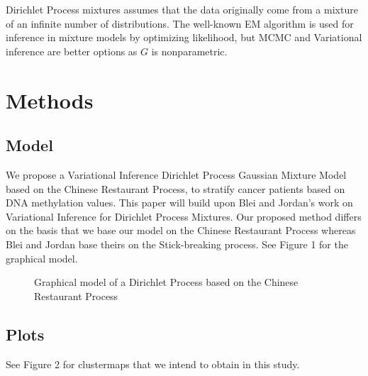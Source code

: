 \documentclass{article}
\begin{document}
Dirichlet Process mixtures assumes that the data originally come from a mixture of an infinite number of distributions.  The well-known EM algorithm is used for inference in mixture models by optimizing likelihood,  but MCMC and Variational inference are better options as $G$ is nonparametric.
\section{Methods}
\label{gen_inst}

\subsection{Model}

We propose a Variational Inference Dirichlet Process Gaussian Mixture Model based on the Chinese Restaurant Process, to stratify cancer patients based on DNA methylation values. This paper will build upon Blei and Jordan's work on Variational Inference for Dirichlet Process Mixtures. Our proposed method differs on the basis that we base our model on the Chinese Restaurant Process whereas Blei and Jordan base theirs on the Stick-breaking process. See Figure 1 for the graphical model.

\begin{figure}[!htp]
\centering
{}
\caption{Graphical model of a Dirichlet Process based on the Chinese Restaurant Process} 
\end{figure}


\subsection{Plots}
See Figure 2 for clustermaps that we intend to obtain in this study. 
\end{document}
